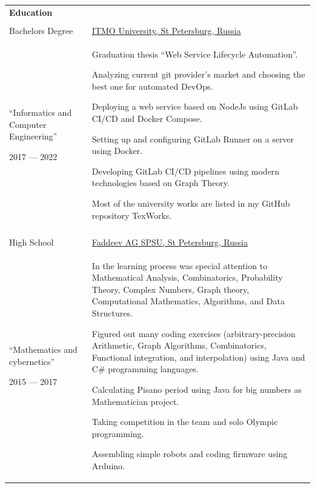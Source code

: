 \documentclass[12pt]{article}
\begin{document}
    \begin{tabularx}{500pt}{eX}
        \textbf{Education} & \\

        &\\

        Bachelors Degree & \underline{ITMO University, St Petersburg, Russia} \\

        ``Informatics and Computer Engineering''

        2017 --- 2022

        & Graduation thesis ``Web Service Lifecycle Automation''.

        Analyzing current git provider's market and choosing the best one for automated DevOps.

        Deploying a web service based on NodeJs using GitLab CI/CD and Docker Compose.

        Setting up and configuring GitLab Runner on a server using Docker.

        Developing GitLab CI/CD pipelines using modern technologies based on Graph Theory.

        Most of the university works are listed in my GitHub repository TexWorks.

        \\

        &\\

        High School & \underline{Faddeev AG SPSU,  St Petersburg, Russia} \\

        ``Mathematics and cybernetics''

        2015 --- 2017

        & In the learning process was special attention to Mathematical Analysis, Combinatorics, Probability Theory, Complex Numbers, Graph theory, Computational Mathematics, Algorithms, and Data Structures.

        Figured out many coding exercises (arbitrary-precision Arithmetic, Graph Algorithms, Combinatorics, Functional integration, and interpolation) using Java and C\# programming languages.

        Calculating Pisano period using Java for big numbers as Mathematician project.

        Taking competition in the team and solo Olympic programming.

        Assembling simple robots and coding firmware using Arduino.


\end{tabularx}
\end{document}
